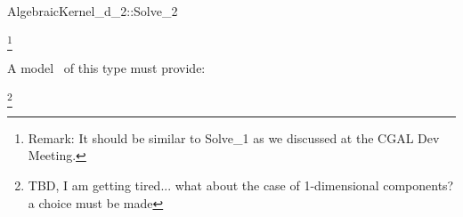 \begin{ccRefConcept}{AlgebraicKernel_d_2::Solve_2}

\ccDefinition

\footnote{Remark: It should be similar to Solve\_1 as we discussed at the CGAL
Dev Meeting.}


A model \ccVar\ of this type must provide:



\footnote{TBD, I am getting tired... what about the case of 1-dimensional components? a choice must be made}

\end{ccRefConcept}
